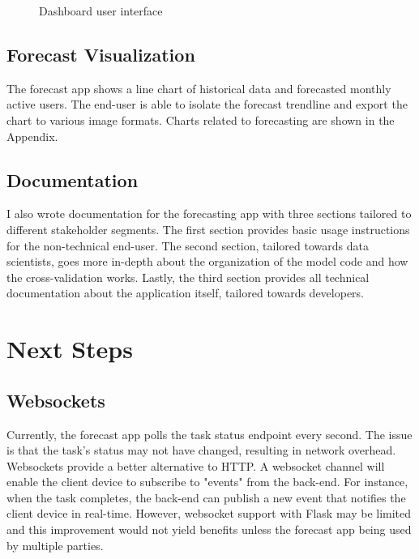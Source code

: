 \documentclass[11pt, oneside, authoryear]{report}
\begin{document}
\begin{figure}[h]
  \caption{Dashboard user interface}
  \centering
  \label{fig:Dashboard}
\end{figure}

\subsection{Forecast Visualization}
The forecast app shows a line chart of historical data and forecasted monthly active users. The end-user is able to isolate the forecast trendline and export the chart to various image formats. Charts related to forecasting are shown in the Appendix.

\subsection{Documentation}
I also wrote documentation for the forecasting app with three sections tailored to different stakeholder segments. The first section provides basic usage instructions for the non-technical end-user. The second section, tailored towards data scientists, goes more in-depth about the organization of the model code and how the cross-validation works. Lastly, the third section provides all technical documentation about the application itself, tailored towards developers.

\section{Next Steps}
\subsection{Websockets}
Currently, the forecast app polls the task status endpoint every second. The issue is that the task's status may not have changed, resulting in network overhead. Websockets provide a better alternative to HTTP. A websocket channel will enable the client device to subscribe to "events" from the back-end. For instance, when the task completes, the back-end can publish a new event that notifies the client device in real-time. However, websocket support with Flask may be limited and this improvement would not yield benefits unless the forecast app being used by multiple parties.
\end{document}

